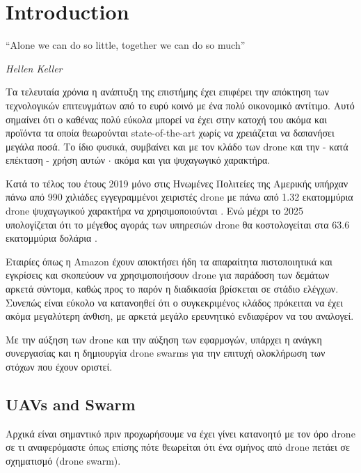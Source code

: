 \chapter{Introduction} %
\label{chap:Chapter1}  %
\epigraph{``Alone we can do so little, together we can do so much” }{\textit{Hellen Keller}}

Τα τελευταία χρόνια η ανάπτυξη της επιστήμης έχει επιφέρει την απόκτηση των 
τεχνολογικών επιτευγμάτων από το ευρύ κοινό με ένα πολύ οικονομικό αντίτιμο. Αυτό σημαίνει
ότι ο καθένας πολύ εύκολα μπορεί να έχει στην κατοχή του ακόμα και προϊόντα τα οποία θεωρούνται 
state-of-the-art χωρίς να χρειάζεται να δαπανήσει μεγάλα ποσά. 
Το ίδιο φυσικά, συμβαίνει και με τον κλάδο των drone και την - κατά επέκταση - χρήση αυτών $\cdot$ ακόμα και 
για ψυχαγωγικό χαρακτήρα.  
\par
Κατά το τέλος του έτους 2019 μόνο στις Ηνωμένες Πολιτείες της Αμερικής υπήρχαν πάνω από 
990 χιλιάδες εγγεγραμμένοι χειριστές drone με πάνω από 1.32 εκατομμύρια drone ψυχαγωγικού 
χαρακτήρα να χρησιμοποιούνται \cite{2019-drone-statistic}. Ενώ μέχρι το 2025 υπολογίζεται 
ότι το μέγεθος αγοράς των υπηρεσιών drone θα κοστολογείται στα 63.6 εκατομμύρια δολάρια \cite{expected-drone-market}.
\par
Εταιρίες όπως η Amazon έχουν αποκτήσει ήδη τα απαραίτητα πιστοποιητικά και εγκρίσεις και σκοπεύουν να 
χρησιμοποιήσουν drone για παράδοση των δεμάτων \cite{amazon-drones} αρκετά σύντομα, καθώς προς το παρόν
η διαδικασία βρίσκεται σε στάδιο ελέγχων. 
Συνεπώς είναι εύκολο να κατανοηθεί ότι ο συγκεκριμένος κλάδος πρόκειται να έχει ακόμα μεγαλύτερη 
άνθιση, με αρκετά μεγάλο ερευνητικό ενδιαφέρον να του αναλογεί.   
\par
Με την αύξηση των drone και την αύξηση των εφαρμογών, υπάρχει η ανάγκη συνεργασίας και η δημιουργία drone swarms 
για την επιτυχή ολοκλήρωση των στόχων που έχουν οριστεί.

\newpage

\section{UAVs and Swarm} \label{sec:Chapter1-1} 

Αρχικά είναι σημαντικό πριν προχωρήσουμε να έχει γίνει κατανοητό με τον όρο drone σε τι 
αναφερόμαστε όπως επίσης πότε θεωρείται ότι ένα σμήνος από drone πετάει σε σχηματισμό (drone swarm).


